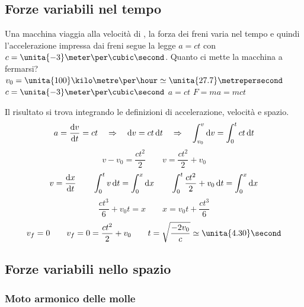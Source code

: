 \subsection{Forze variabili nel tempo}
\begin{Es}
Una macchina viaggia alla velocità di \kilo\meter\per\hour, la forza dei freni
varia nel tempo e quindi l'accelerazione impressa dai freni segue
la legge $a=ct$ con $c=\unita{-3}\meter\per\cubic\second$. Quanto ci mette la
macchina a fermarsi?
\newline
\newline $v_0=\unita{100}\kilo\metre\per\hour\simeq \unita{27.7}\metrepersecond$
\newline $c=\unita{-3}\meter\per\cubic\second$
\newline $a=ct$
\newline $F=ma=mct$

Il risultato si trova integrando le definizioni di accelerazione, velocità e spazio.
\[a=\frac{\mathrm{d} v}{\mathrm{d} t}=ct \quad \Rightarrow \quad\mathrm{d} v=ct\,\mathrm{d}
t\quad\Rightarrow\quad\int_{v_0}^v\mathrm{d} v=\int_0^t ct\,\mathrm{d} t\]
\begin{equation*}v-v_0=\frac{ct^2}{2}\qquad v=\frac{ct^2}{2}+v_0\end{equation*}
\[v=\frac{\mathrm{d} x}{\mathrm{d} t}\qquad\int_0^t v\,\mathrm{d} t=\int_0^x\mathrm{d}
x\qquad\int_0^t\frac{ct^2}{2}+v_0\,\mathrm{d} t=\int_0^x\mathrm{d} x\]
\begin{equation*}\frac{ct^3}{6}+v_0t=x\qquad x=v_0t+\frac{ct^3}{6}\end{equation*}
\[v_f=0\qquad v_f=0=\frac{ct^2}{2}+v_0\qquad
t=\sqrt{\frac{-2v_0}{c}}\simeq \unita{4.30}\second\]
\end{Es}

\subsection{Forze variabili nello spazio}
\subsubsection{Moto armonico delle molle}
\label{armonico}

